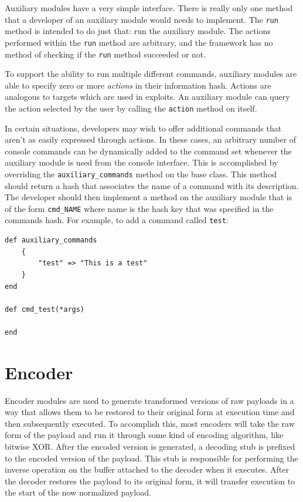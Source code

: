 \documentclass{report}
\begin{document}
\par
Auxiliary modules have a very simple interface.  There is really only one
method that a developer of an auxiliary module would needs to implement.  The
\texttt{run} method is intended to do just that: run the auxiliary module.
The actions performed within the \texttt{run} method are arbitrary, and the
framework has no method of checking if the \texttt{run} method succeeded or
not.

\par
To support the ability to run multiple different commands, auxiliary modules
are able to specify zero or more \textit{actions} in their information hash.
Actions are analogous to targets which are used in exploits.  An auxiliary
module can query the action selected by the user by calling the
\texttt{action} method on itself.

\par
In certain situations, developers may wish to offer additional commands that
aren't as easily expressed through actions.  In these cases, an arbitrary
number of console commands can be dynamically added to the command set
whenever the auxiliary module is used from the console interface.  This is
accomplished by overriding the \texttt{auxiliary\_commands} method on the base
class.  This method should return a hash that associates the name of a command
with its description.  The developer should then implement a method on the
auxiliary module that is of the form \texttt{cmd\_NAME} where name is the hash
key that was specified in the commands hash.  For example, to add a command
called \texttt{test}:

\begin{verbatim}
def auxiliary_commands
	{
		"test" => "This is a test"
	}
end

def cmd_test(*args)
	
end
\end{verbatim}

    \section{Encoder}

\par
Encoder modules are used to generate transformed versions of raw
payloads in a way that allows them to be restored to their original
form at execution time and then subsequently executed.  To
accomplish this, most encoders will take the raw form of the payload
and run it through some kind of encoding algorithm, like bitwise
XOR.  After the encoded version is generated, a decoding stub is
prefixed to the encoded version of the payload.  This stub is
responsible for performing the inverse operation on the buffer
attached to the decoder when it executes.  After the decoder
restores the payload to its original form, it will transfer
execution to the start of the now normalized payload.
\end{document}
